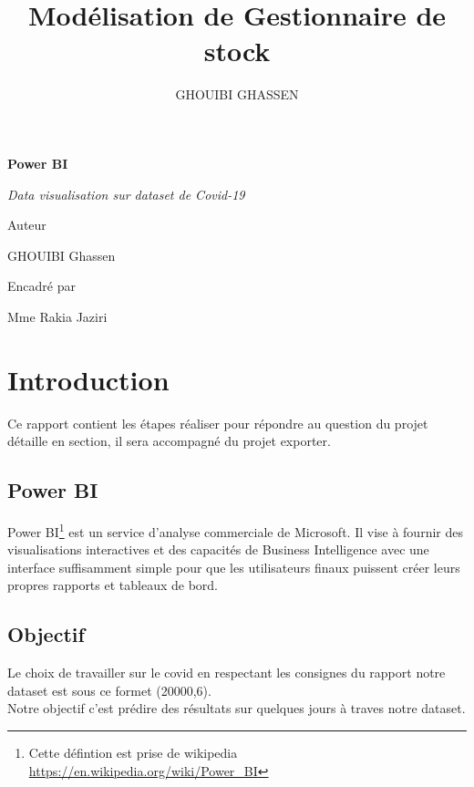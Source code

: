 \documentclass[french,a4paper,11pt,oneside]{book}
\author{\color{blue} \raggedright GHOUIBI GHASSEN}
\title{\color{red} \normalfont\huge Modélisation de Gestionnaire de stock}
\begin{document}
 \begin{titlepage}
  \centering 

  \vspace{1cm}

  \vspace{0.5cm}
  {\huge\bfseries Power BI\par}
  \vspace{0.5cm}
  \vfill
  {\Large\itshape \color{googlegreen} Data visualisation sur dataset de Covid-19\par}
  \vfill
  {\large Auteur \par
  GHOUIBI Ghassen\textsc{}\par}
  \vspace{1cm}
  {\large Encadré par \par
 Mme Rakia Jaziri\textsc{}\par
 
  }
 \end{titlepage}
	\tableofcontents
	
	\newpage
	\section{Introduction}{
		Ce rapport contient les étapes réaliser pour répondre au question du projet détaille en section, il sera accompagné du projet exporter.\\
		\subsection{Power BI}{
		Power BI\footnote{Cette défintion est prise de wikipedia \url{https://en.wikipedia.org/wiki/Power_BI}} est un service d'analyse commerciale de Microsoft. Il vise à fournir des visualisations interactives et des capacités de Business Intelligence avec une interface suffisamment simple pour que les utilisateurs finaux puissent créer leurs propres rapports et tableaux de bord.	
		}
		\subsection{Objectif}{
			Le choix de travailler sur le covid en respectant les consignes du rapport notre dataset est sous ce formet (20000,6).\\
			Notre objectif c'est prédire des résultats sur quelques jours à traves notre dataset.
		}
	
	}
\end{document}
